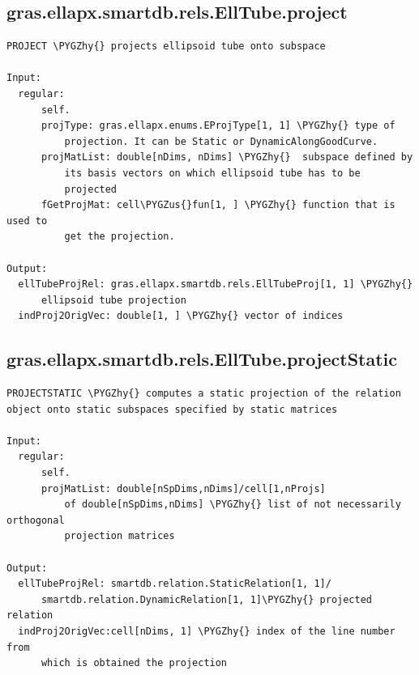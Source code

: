 \documentclass[letterpaper,10pt,english]{sphinxmanual}
\def\PYGZus{\char`\_}
\def\PYGZhy{\char`\-}
\begin{document}
\subsection{gras.ellapx.smartdb.rels.EllTube.project}
\label{chap_functions:gras-ellapx-smartdb-rels-elltube-project}
\begin{Verbatim}[commandchars=\\\{\}]
PROJECT \PYGZhy{} projects ellipsoid tube onto subspace

Input:
  regular:
      self.
      projType: gras.ellapx.enums.EProjType[1, 1] \PYGZhy{} type of
          projection. It can be Static or DynamicAlongGoodCurve.
      projMatList: double[nDims, nDims] \PYGZhy{}  subspace defined by
          its basis vectors on which ellipsoid tube has to be
          projected
      fGetProjMat: cell\PYGZus{}fun[1, ] \PYGZhy{} function that is used to
          get the projection.

Output:
  ellTubeProjRel: gras.ellapx.smartdb.rels.EllTubeProj[1, 1] \PYGZhy{}
      ellipsoid tube projection
  indProj2OrigVec: double[1, ] \PYGZhy{} vector of indices
\end{Verbatim}


\subsection{gras.ellapx.smartdb.rels.EllTube.projectStatic}
\label{chap_functions:gras-ellapx-smartdb-rels-elltube-projectstatic}
\begin{Verbatim}[commandchars=\\\{\}]
PROJECTSTATIC \PYGZhy{} computes a static projection of the relation
object onto static subspaces specified by static matrices

Input:
  regular:
      self.
      projMatList: double[nSpDims,nDims]/cell[1,nProjs]
          of double[nSpDims,nDims] \PYGZhy{} list of not necessarily orthogonal
          projection matrices

Output:
  ellTubeProjRel: smartdb.relation.StaticRelation[1, 1]/
      smartdb.relation.DynamicRelation[1, 1]\PYGZhy{} projected relation
  indProj2OrigVec:cell[nDims, 1] \PYGZhy{} index of the line number from
      which is obtained the projection
\end{Verbatim}
\end{document}
